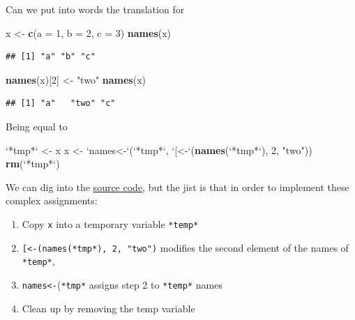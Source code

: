 \documentclass[]{book}
\newenvironment{Shaded}{\begin{snugshade}}{\end{snugshade}}
\newcommand{\DataTypeTok}[1]{\textcolor[rgb]{0.13,0.29,0.53}{#1}}
\newcommand{\DecValTok}[1]{\textcolor[rgb]{0.00,0.00,0.81}{#1}}
\newcommand{\KeywordTok}[1]{\textcolor[rgb]{0.13,0.29,0.53}{\textbf{#1}}}
\newcommand{\NormalTok}[1]{#1}
\newcommand{\StringTok}[1]{\textcolor[rgb]{0.31,0.60,0.02}{#1}}
\providecommand{\tightlist}{%
  \setlength{\itemsep}{0pt}\setlength{\parskip}{0pt}}
\begin{document}
Can we put into words the translation for

\begin{Shaded}
\begin{Highlighting}[]
\NormalTok{x <-}\StringTok{ }\KeywordTok{c}\NormalTok{(}\DataTypeTok{a =} \DecValTok{1}\NormalTok{, }\DataTypeTok{b =} \DecValTok{2}\NormalTok{, }\DataTypeTok{c =} \DecValTok{3}\NormalTok{)}
\KeywordTok{names}\NormalTok{(x)}
\end{Highlighting}
\end{Shaded}

\begin{verbatim}
## [1] "a" "b" "c"
\end{verbatim}

\begin{Shaded}
\begin{Highlighting}[]
\KeywordTok{names}\NormalTok{(x)[}\DecValTok{2}\NormalTok{] <-}\StringTok{ "two"}
\KeywordTok{names}\NormalTok{(x)}
\end{Highlighting}
\end{Shaded}

\begin{verbatim}
## [1] "a"   "two" "c"
\end{verbatim}

Being equal to

\begin{Shaded}
\begin{Highlighting}[]
\StringTok{`}\DataTypeTok{*tmp*}\StringTok{`}\NormalTok{ <-}\StringTok{ }\NormalTok{x}
\NormalTok{x <-}\StringTok{ `}\DataTypeTok{names<-}\StringTok{`}\NormalTok{(}\StringTok{`}\DataTypeTok{*tmp*}\StringTok{`}\NormalTok{, }\StringTok{`}\DataTypeTok{[<-}\StringTok{`}\NormalTok{(}\KeywordTok{names}\NormalTok{(}\StringTok{`}\DataTypeTok{*tmp*}\StringTok{`}\NormalTok{), }\DecValTok{2}\NormalTok{, }\StringTok{"two"}\NormalTok{))}
\KeywordTok{rm}\NormalTok{(}\StringTok{`}\DataTypeTok{*tmp*}\StringTok{`}\NormalTok{)}
\end{Highlighting}
\end{Shaded}

We can dig into the \href{https://github.com/wch/r-source/blob/2cdea4811caa2417e2cf32a0c7ad3be70325eec1/src/main/eval.c\#L2787}{source code}, but the jist is that in order to implement these complex assignments:

\begin{enumerate}
\def\labelenumi{\arabic{enumi}.}
\tightlist
\item
  Copy \texttt{x} into a temporary variable \texttt{*temp*}
\item
  \texttt{{[}\textless{}-(names(*tmp*),\ 2,\ "two")} modifies the second element of the names of \texttt{*temp*},
\item
  \texttt{names\textless{}-}(\texttt{*tmp*} assigns step 2 to \texttt{*temp*} names
\item
  Clean up by removing the temp variable
\end{enumerate}
\end{document}
